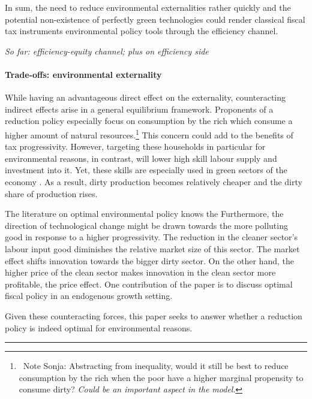 \documentclass[12pt]{article}
\begin{document}
In sum, the need to reduce environmental externalities rather quickly and the potential non-existence of perfectly green technologies could render classical fiscal tax instruments environmental policy tools through the efficiency channel. 

\textit{So far: efficiency-equity channel; plus on efficiency side}
\paragraph{Trade-offs: environmental externality}
While having an advantageous direct effect on the externality, counteracting indirect effects arise in a general equilibrium framework. Proponents of a reduction policy especially focus on consumption by the rich which consume a higher amount of natural resources.\footnote{\ Note Sonja: Abstracting from inequality, would it still be best to reduce consumption by the rich when the poor have a higher marginal propensity to consume dirty? \textit{Could be an important aspect in the model}.}
This concern could add to the benefits of tax progressivity.
However, targeting these households in particular for environmental reasons, in contrast, will lower high skill labour supply and investment into it. Yet, these skills are especially used in green sectors of the economy \citep{Consoli2016DoCapital}. As a result, dirty production becomes relatively cheaper and the dirty share of production rises. 

The literature on optimal environmental policy knows the 
Furthermore, the direction of technological change might be drawn towards the more polluting good in response to a higher progressivity. The reduction in the cleaner sector's labour input good diminishes the relative market size of this sector. The market effect shifts innovation towards the bigger dirty sector. On the other hand, the higher price of the clean sector makes innovation in the clean sector more profitable, the price effect. 
One contribution of the paper is to discuss optimal fiscal policy in an endogenous growth setting. 

Given these counteracting forces, this paper seeks to answer whether a reduction policy is indeed optimal for environmental reasons. 
\\

\noindent\rule[1ex]{\textwidth}{1pt}
\end{document}
